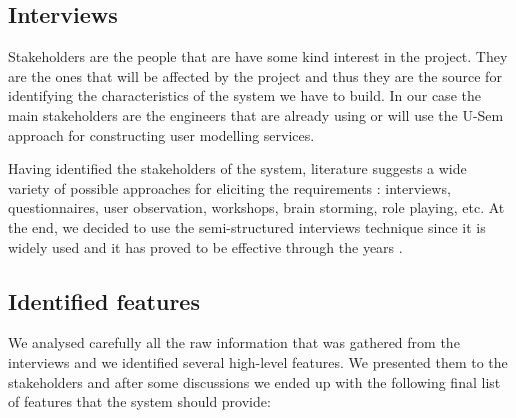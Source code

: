 \subsection{Interviews}

Stakeholders are the people that are have some kind interest in the project. They are the ones that will be affected by the project and thus they are the source for identifying the characteristics of the system we have to build. In our case the main stakeholders are the engineers that are already using or will use the U-Sem approach for constructing user modelling services.

Having identified the stakeholders of the system, literature suggests a wide variety of possible approaches for eliciting the requirements \cite{hickey2004unified} : interviews, questionnaires, user observation, workshops, brain storming, role playing, etc. 
At the end, we decided to use the semi-structured interviews technique since it is widely used and it has proved to be effective through the years \cite{dieste2008understanding}. 

\subsection{Identified features}

We analysed carefully all the raw information that was gathered from the interviews and we identified several high-level features. We presented them to the stakeholders and after some discussions we ended up with the following final list of features that the system should provide: 

